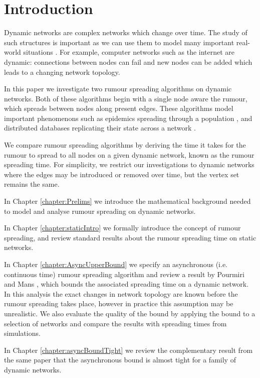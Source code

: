 \chapter{Introduction}

Dynamic networks are complex networks which change over time. The study of such structures is important as we can use them to model many important real-world situations \cite{motivation}. For example, computer networks such as the internet are dynamic: connections between nodes can fail and new nodes can be added which leads to a changing network topology. 

In this paper we investigate two rumour spreading algorithms on dynamic networks. Both of these algorithms begin with a single node aware the rumour, which spreads between nodes along present edges. These algorithms model important phenomenons such as epidemics spreading through a population \cite{staticsWellUnderstood}, and distributed databases replicating their state across a network \cite{stateReplication}. 

We compare rumour spreading algorithms by deriving the time it takes for the rumour to spread to all nodes on a given dynamic network, known as the rumour spreading time. 
For simplicity, we restrict our investigations to dynamic networks where the edges may be introduced or removed over time, but the vertex set remains the same. 

In Chapter \ref{chapter:Prelims} we introduce the mathematical background needed to model and analyse rumour spreading on dynamic networks.

In Chapter \ref{chapter:staticIntro} we formally introduce the concept of rumour spreading, and review standard results about the rumour spreading time on static networks.

In Chapter \ref{chapter:AsyncUpperBound} we specify an asynchronous (i.e. continuous time) rumour spreading algorithm and review a result by Pourmiri and Mans \cite{asyncPaper}, which bounds the associated spreading time on a dynamic network. In this analysis the exact changes in network topology are known before the rumour spreading takes place, however in practice this assumption may be unrealistic. We also evaluate the quality of the bound by applying the bound to a selection of networks and compare the results with spreading times from simulations.

In Chapter \ref{chapter:asyncBoundTight} we review the complementary result from the same paper \cite{asyncPaper} that the asynchronous bound is almost tight for a family of dynamic networks.

